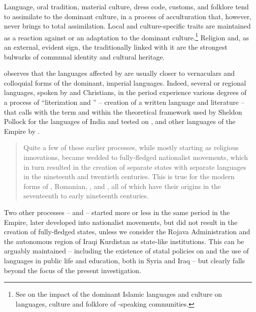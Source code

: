 \documentclass[output=paper,colorlinks,citecolor=brown,arabfont,syriacfont]{langscibook}
\begin{document}
Language, oral tradition, material culture, dress code, customs, and folklore tend to assimilate to the dominant culture, in a process of acculturation that, however, never brings to total assimilation. Local and culture-specific traits are maintained as a reaction against or an adaptation to the dominant culture.\footnote{%
See \citet{mengozzi2023b} on the impact of the dominant Islamic languages and culture on languages, culture and folklore of -speaking communities.} Religion and, as an external, evident sign, the  traditionally linked with it are the strongest bulwarks of communal identity and cultural heritage.

\citet{luffin2001} observes that the languages affected by  are usually closer to vernaculars and colloquial forms of the dominant, imperial languages. Indeed, several  or regional languages, spoken by  and Christians, in the  period experience various degrees of a process of ``literization and '' -- creation of a written language and literature -- that \citet[9]{murre-van_den_berg2020} calls  with the term and within the theoretical framework used by Sheldon Pollock for the languages of India and tested on ,  and other languages of the  Empire by \citet{leezenberg2014,leezenberg2020,leezenberg2021}.

\begin{quote}
Quite a few of these earlier  processes, while mostly starting as religious innovations, became wedded to fully-fledged nationalist movements, which in turn resulted in the creation of separate states with separate languages in the nineteenth and twentieth centuries. This is true for the modern forms of , Romanian, ,  and , all of which have their origins in the seventeenth to early nineteenth centuries. \citep[10]{murre-van_den_berg2020}
\end{quote}

Two other  processes --  and  -- started more or less in the same period in the  Empire, later developed into nationalist movements, but did not result in the creation of fully-fledged states, unless we consider the Rojava Administration and the autonomous region of Iraqi Kurdistan as state-like institutions. This can be arguably maintained -- including the existence of statal policies on  and the use of languages in public life and education, both in Syria and Iraq -- but clearly falls beyond the focus of the present investigation.
\end{document}
